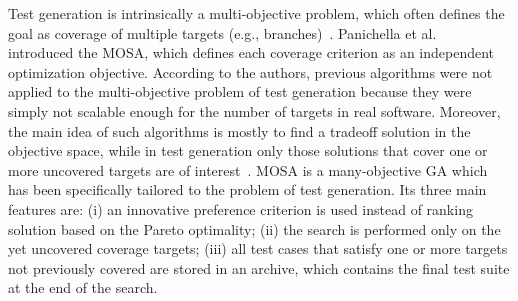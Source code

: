 \documentclass{article}
\begin{document}

Test generation is intrinsically a multi-objective problem, which often defines the goal as coverage of multiple targets (e.g., branches)~\cite{Panichella2018}. Panichella et al.~\cite{Panichella_2015} introduced the \ac{MOSA}, which defines each coverage criterion as an independent optimization objective. According to the authors, previous algorithms were not applied to the multi-objective problem of test generation because they were simply not scalable enough for the number of targets in real software. Moreover, the main idea of such algorithms is mostly to find a tradeoff solution in the objective space, while in test generation only those solutions that cover one or more uncovered targets are of interest~\cite{Panichella2018}. \ac{MOSA} is a many-objective \ac{GA} which has been specifically tailored to the problem of test generation. Its three main features are: (i) an innovative preference criterion is used instead of ranking solution based on the Pareto optimality; (ii) the search is performed only on the yet uncovered coverage targets; (iii) all test cases that satisfy one or more targets not previously covered are stored in an archive, which contains the final test suite at the end of the search.
\end{document}

